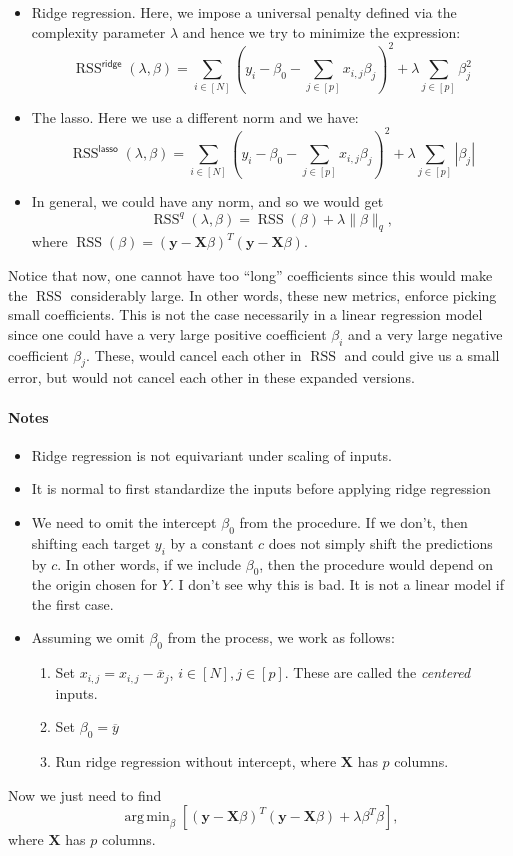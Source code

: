 \documentclass[11pt]{article}
\theoremstyle{definition}
\newcommand{\XX}{\mathbf{X}}
\newcommand{\yy}{\mathbf{y}}
\newcommand{\ridge}{\textsf{ridge}}
\newcommand{\lasso}{\textsf{lasso}}
\DeclareMathOperator*{\argmin}{arg\,min} \DeclareMathOperator*{\Cov}{Cov}
\DeclareMathOperator*{\RSS}{RSS} \DeclareMathOperator*{\WRSS}{WRSS}
\begin{document}
\begin{itemize}
	\item Ridge regression. Here, we impose a universal penalty defined via
	      the complexity parameter $\lambda$ and hence we try to minimize the expression:
	      \[\RSS^\ridge(\lambda,\beta)=\sum_{i\in[N]}\left(y_i-\beta_0-\sum_{j\in[p]}x_{i,j}\beta_j\right)^2
		      + \lambda\sum_{j\in[p]}\beta_j^2\]

	\item The lasso. Here we use a different norm and we have:
	      \[\RSS^\lasso(\lambda,\beta)=\sum_{i\in[N]}\left(y_i-\beta_0-\sum_{j\in[p]}x_{i,j}\beta_j\right)^2
		      + \lambda\sum_{j\in[p]}|\beta_j|\]

	\item In general, we could have any norm, and so we would get
	      \[\RSS^q(\lambda,\beta)=\RSS(\beta) + \lambda \|\beta\|_q,\] where
	      $\RSS(\beta)=(\yy-\XX\beta)^T(\yy-\XX\beta)$.
\end{itemize}
Notice that now, one cannot have too ``long'' coefficients since this would make
the $\RSS$ considerably large. In other words, these new metrics, enforce
picking small coefficients. This is not the case necessarily in a linear
regression model since one could have a very large positive coefficient
$\beta_i$ and a very large negative coefficient $\beta_j$. These, would cancel
each other in $\RSS$ and could give us a small error, but would not cancel each
other in these expanded versions.

\paragraph{Notes}
\begin{itemize}
	\item Ridge regression is not equivariant under scaling of inputs.
	\item It is normal to first standardize the inputs before applying ridge
	      regression
	\item We need to omit the intercept $\beta_0$ from the procedure. If we
	      don't, then shifting each target $y_i$ by a constant $c$ does not simply
	      shift the predictions by $c$. In other words, if we include $\beta_0$, then
	      the procedure would depend on the origin chosen for $Y$. I don't see why
	      this is bad. It is not a linear model if the first case.
	\item Assuming we omit $\beta_0$ from the process, we work as follows:
	      \begin{enumerate}
		      \item Set $x_{i,j}=x_{i,j}-\overline x_j$, $i\in[N],j\in[p]$. These are
		            called the \emph{centered} inputs.
		      \item Set $\beta_0=\overline y$
		      \item Run ridge regression without intercept, where $\XX$ has $p$
		            columns.
	      \end{enumerate}
\end{itemize}
Now we just need to find
\[\argmin_\beta \left[(\yy-\XX\beta)^T(\yy-\XX\beta) + \lambda\beta^T\beta\right],\]
where $\XX$ has $p$ columns.
\end{document}
